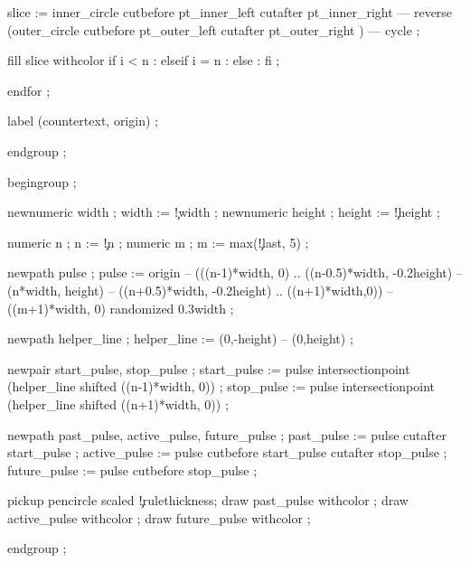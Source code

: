     slice := inner_circle cutbefore pt_inner_left cutafter pt_inner_right 
       --- reverse (outer_circle cutbefore pt_outer_left cutafter pt_outer_right ) 
       --- cycle ;

    fill slice withcolor 
      if i < n     :  
      elseif i = n : 
      else         : 
      fi ;

  endfor ;

  label (countertext, origin) ;

  endgroup ;

\stopuseMPgraphic




  begingroup ;

  newnumeric width  ; width  := \visualcounterparameter\c!width ;
  newnumeric height ; height := \visualcounterparameter\c!height ;

  numeric n ; n := \visualcounterparameter\c!n ;
  numeric m ; m := max(\visualcounterparameter\c!last, 5) ;


  newpath pulse ;
  pulse := origin -- (((n-1)*width, 0) .. ((n-0.5)*width, -0.2height) 
                  -- (n*width, height) -- ((n+0.5)*width, -0.2height) 
                  .. ((n+1)*width,0))  -- ((m+1)*width, 0) 
                  randomized 0.3width ;

  newpath helper_line ;
  helper_line := (0,-height) -- (0,height) ;

  newpair start_pulse, stop_pulse ;
  start_pulse := pulse intersectionpoint (helper_line shifted ((n-1)*width, 0)) ;
  stop_pulse  := pulse intersectionpoint (helper_line shifted ((n+1)*width, 0)) ;

  
  newpath past_pulse, active_pulse, future_pulse ;
  past_pulse    := pulse cutafter start_pulse ;
  active_pulse  := pulse cutbefore start_pulse cutafter stop_pulse ;
  future_pulse  := pulse cutbefore stop_pulse ;

  pickup pencircle scaled \visualcounterparameter\c!rulethickness\space ;
  draw past_pulse   withcolor    ;
  draw active_pulse withcolor  ;
  draw future_pulse withcolor  ;

  endgroup ;
\stopuseMPgraphic


\protect
